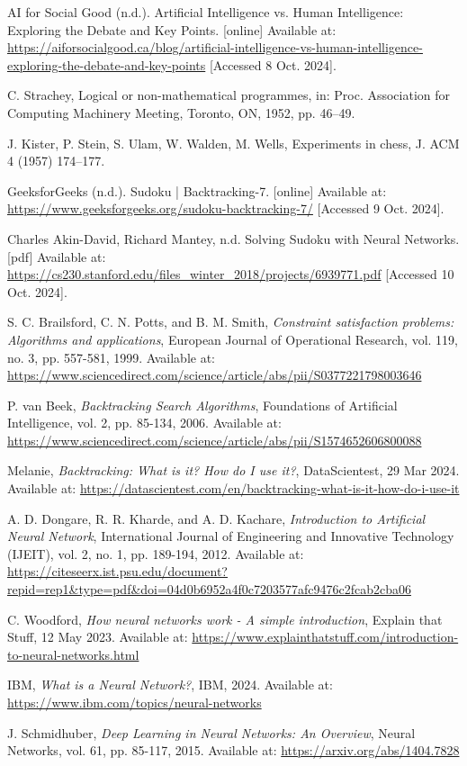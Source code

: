 \documentclass[]{final_report}
\begin{document}
\newpage
\begin{thebibliography}{99}

AI for Social Good (n.d.). Artificial Intelligence vs. Human Intelligence: Exploring the Debate and Key Points. [online] Available at: \url{https://aiforsocialgood.ca/blog/artificial-intelligence-vs-human-intelligence-exploring-the-debate-and-key-points} [Accessed 8 Oct. 2024].

 C. Strachey, Logical or non-mathematical programmes, in: Proc. Association for Computing Machinery Meeting, Toronto, ON, 1952, pp. 46–49.

 J. Kister, P. Stein, S. Ulam, W. Walden, M. Wells, Experiments in chess, J. ACM 4 (1957) 174–177.

 GeeksforGeeks (n.d.). Sudoku | Backtracking-7. [online] Available at: \url{https://www.geeksforgeeks.org/sudoku-backtracking-7/} [Accessed 9 Oct. 2024]. 

 Charles Akin-David, Richard Mantey, n.d. Solving Sudoku with Neural Networks. [pdf] Available at: \url{https://cs230.stanford.edu/files_winter_2018/projects/6939771.pdf} [Accessed 10 Oct. 2024].

 S. C. Brailsford, C. N. Potts, and B. M. Smith, \textit{Constraint satisfaction problems: Algorithms and applications}, European Journal of Operational Research, vol. 119, no. 3, pp. 557-581, 1999. Available at: \url{https://www.sciencedirect.com/science/article/abs/pii/S0377221798003646}

 P. van Beek, \textit{Backtracking Search Algorithms}, Foundations of Artificial Intelligence, vol. 2, pp. 85-134, 2006. Available at: \url{https://www.sciencedirect.com/science/article/abs/pii/S1574652606800088}

 Melanie, \textit{Backtracking: What is it? How do I use it?}, DataScientest, 29 Mar 2024. Available at: \url{https://datascientest.com/en/backtracking-what-is-it-how-do-i-use-it}

 A. D. Dongare, R. R. Kharde, and A. D. Kachare, \textit{Introduction to Artificial Neural Network}, International Journal of Engineering and Innovative Technology (IJEIT), vol. 2, no. 1, pp. 189-194, 2012. Available at: \url{https://citeseerx.ist.psu.edu/document?repid=rep1&type=pdf&doi=04d0b6952a4f0c7203577afc9476c2fcab2cba06} 

 C. Woodford, \textit{How neural networks work - A simple introduction}, Explain that Stuff, 12 May 2023. Available at: \url{https://www.explainthatstuff.com/introduction-to-neural-networks.html} 

 IBM, \textit{What is a Neural Network?}, IBM, 2024. Available at: \url{https://www.ibm.com/topics/neural-networks} 

 J. Schmidhuber, \textit{Deep Learning in Neural Networks: An Overview}, Neural Networks, vol. 61, pp. 85-117, 2015. Available at: \url{https://arxiv.org/abs/1404.7828}

\end{thebibliography}
\end{document}
